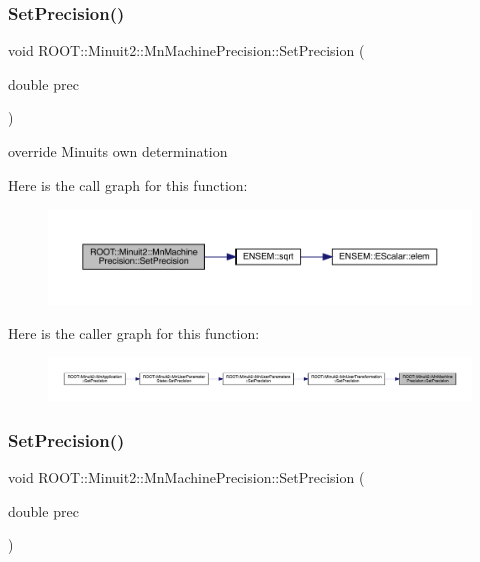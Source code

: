 \subsubsection{\texorpdfstring{SetPrecision()}{SetPrecision()}\hspace{0.1cm}{\footnotesize\ttfamily [2/3]}}
{\footnotesize\ttfamily void R\+O\+O\+T\+::\+Minuit2\+::\+Mn\+Machine\+Precision\+::\+Set\+Precision (\begin{DoxyParamCaption}\item[{double}]{prec }\end{DoxyParamCaption})\hspace{0.3cm}{\ttfamily [inline]}}



override Minuit\textquotesingle{}s own determination 

Here is the call graph for this function\+:
\nopagebreak
\begin{figure}[H]
\begin{center}
\leavevmode
\includegraphics[width=350pt]{d4/d40/classROOT_1_1Minuit2_1_1MnMachinePrecision_a625938e3c6362a06d09fc76e59f366b6_cgraph}
\end{center}
\end{figure}
Here is the caller graph for this function\+:
\nopagebreak
\begin{figure}[H]
\begin{center}
\leavevmode
\includegraphics[width=350pt]{d4/d40/classROOT_1_1Minuit2_1_1MnMachinePrecision_a625938e3c6362a06d09fc76e59f366b6_icgraph}
\end{center}
\end{figure}
\mbox{\label{classROOT_1_1Minuit2_1_1MnMachinePrecision_a625938e3c6362a06d09fc76e59f366b6}} 
\subsubsection{\texorpdfstring{SetPrecision()}{SetPrecision()}\hspace{0.1cm}{\footnotesize\ttfamily [3/3]}}
{\footnotesize\ttfamily void R\+O\+O\+T\+::\+Minuit2\+::\+Mn\+Machine\+Precision\+::\+Set\+Precision (\begin{DoxyParamCaption}\item[{double}]{prec }\end{DoxyParamCaption})\hspace{0.3cm}{\ttfamily [inline]}}



